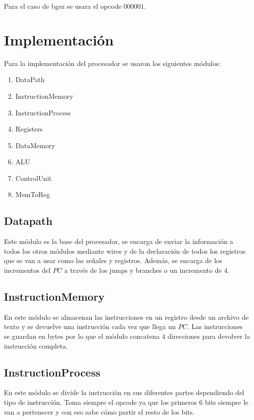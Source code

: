 \documentclass[12pt,a4paper]{article}
\begin{document}
Para el caso de bgez se usara el opcode $000001$.


\section{Implementación}
Para la implementación del procesador se usaron los siguientes módulos:
\begin{enumerate}
\item DataPath
\item InstructionMemory
\item InstructionProcess
\item Registers
\item DataMemory
\item ALU
\item ControlUnit
\item MemToReg
\end{enumerate}

\subsection{Datapath}
\text Este módulo es la base del procesador, se encarga de enviar la información a todos los otros módulos mediante wires y de la declaración de todos los registros que se van a usar como las señales y registros. Además, se encarga de los incrementos del $PC$ a través de los jumps y branches o un incremento de 4.

\subsection{InstructionMemory}
\text En este módulo se almacenan las instrucciones en un registro desde un archivo de texto y se devuelve una instrucción cada vez
que llega un $PC$. Las instrucciones se guardan en bytes por lo que el módulo concatena 4 direcciones para devolver la instrucción completa.

\subsection{InstructionProcess}
\text En este módulo se divide la instrucción en sus diferentes partes dependiendo del tipo de instrucción. Toma siempre el opcode ya que los primeros 6 bits siempre le van a pertenecer y con eso sabe cómo partir el resto de los bits.
\end{document}
